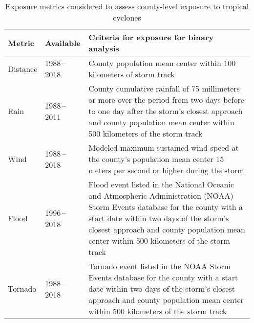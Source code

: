 \begin{table}%
\centering 
\caption{Exposure metrics considered to assess county-level exposure to 
tropical cyclones}
\begin{tabular}{p{0.9cm}p{2.5cm}p{9cm}} 
Metric & Available & Criteria for exposure for binary analysis \\ \midrule 
Distance & 1988\,--\,2018 & County population mean center within 100 kilometers of storm track \\ 
Rain & 1988\,--\,2011 & County cumulative rainfall of 75 millimeters or more over the period from two days before to one day after the storm's closest approach and county population mean center within 500 kilometers of the storm track \\ 
Wind & 1988\,--\,2018 & Modeled maximum sustained wind speed at the county's population mean center 15 meters per second or higher during the storm\\ 
Flood & 1996\,--\,2018 & Flood event listed in the National Oceanic and Atmospheric Administration (NOAA) Storm Events database for the county with a start date within two days of the storm's closest approach and county population mean center within 500 kilometers of the storm track \\
Tornado & 1988\,--\,2018 & Tornado event listed in the NOAA Storm Events database for the county with a start date within two days of the storm's closest approach and county population mean center within 500 kilometers of the storm track\\
\bottomrule 
\end{tabular} 
\label{tab:exposuremetrics} 
\end{table}
